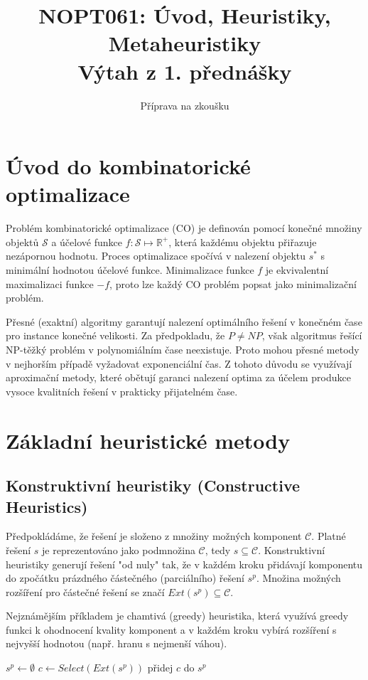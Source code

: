 \documentclass[12pt,a4paper]{article}
\title{NOPT061: Úvod, Heuristiky, Metaheuristiky \\ \large Výtah z 1. přednášky}
\author{Příprava na zkoušku}
\date{}
\theoremstyle{definition}
\begin{document}
\maketitle

\section{Úvod do kombinatorické optimalizace}
Problém kombinatorické optimalizace (CO) je definován pomocí konečné množiny objektů $\mathcal{S}$ a účelové funkce $f:\mathcal{S}\mapsto\mathbb{R}^{+}$, která každému objektu přiřazuje nezápornou hodnotu. Proces optimalizace spočívá v nalezení objektu $s^{*}$ s minimální hodnotou účelové funkce. Minimalizace funkce $f$ je ekvivalentní maximalizaci funkce $-f$, proto lze každý CO problém popsat jako minimalizační problém.

Přesné (exaktní) algoritmy garantují nalezení optimálního řešení v konečném čase pro instance konečné velikosti. Za předpokladu, že $P \neq NP$, však algoritmus řešící NP-těžký problém v polynomiálním čase neexistuje. Proto mohou přesné metody v nejhorším případě vyžadovat exponenciální čas. Z tohoto důvodu se využívají aproximační metody, které obětují garanci nalezení optima za účelem produkce vysoce kvalitních řešení v prakticky přijatelném čase.

\section{Základní heuristické metody}

\subsection{Konstruktivní heuristiky (Constructive Heuristics)}
Předpokládáme, že řešení je složeno z množiny možných komponent $\mathcal{C}$. Platné řešení $s$ je reprezentováno jako podmnožina $\mathcal{C}$, tedy $s \subseteq \mathcal{C}$. Konstruktivní heuristiky generují řešení "od nuly" tak, že v každém kroku přidávají komponentu do zpočátku prázdného částečného (parciálního) řešení $s^p$. Množina možných rozšíření pro částečné řešení se značí $Ext(s^p) \subseteq \mathcal{C}$. 

Nejznámějším příkladem je chamtivá (greedy) heuristika, která využívá greedy funkci k ohodnocení kvality komponent a v každém kroku vybírá rozšíření s nejvyšší hodnotou (např. hranu s nejmenší váhou).

\begin{algorithm}[H]
\caption{Constructive Heuristic }
\begin{algorithmic}[1]
\STATE $s^p \gets \emptyset$ 
\STATE $c \gets Select(Ext(s^p))$ 
\STATE přidej $c$ do $s^p$ 
\ENDWHILE
\end{algorithmic}
\end{algorithm}
\end{document}
